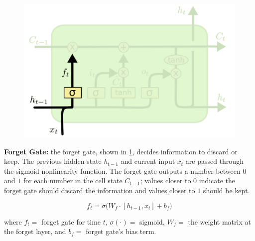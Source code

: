 \begin{program}
\begin{figure} 
\begin{center}
    \vspace{-30pt}
    \includegraphics[width=0.9\linewidth]{imgs/lstm_forgetGate.png}
\end{center}
\label{fig:forgetGate}
\end{figure}

\ContentFontSize

\textbf{Forget Gate: } the forget gate, shown in \cref{fig:forgetGate}, decides information to discard or keep. The previous hidden state $h_{t-1}$ and current input $x_t$ are passed through the sigmoid nonlinearity function. The forget gate outputs a number between $0$ and $1$ for each number in the cell state $C_{t-1}$; values closer to $0$ indicate the forget gate should discard the information and values closer to $1$ should be kept. 

\begin{equation}
f_t = \sigma \Big( W_f \cdot [h_{t-1}, x_t] + b_f \Big)
\end{equation} 

where $f_t =$ forget gate for time $t$, $\sigma(\cdot) =$ sigmoid, $W_f =$ the weight matrix at the forget layer, and $b_f =$ forget gate's bias term. 

\end{program}



